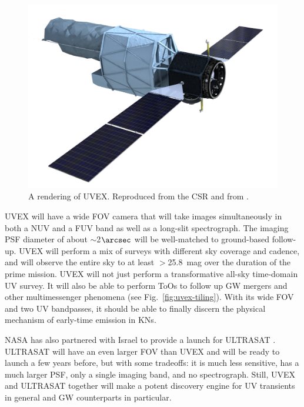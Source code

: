 \documentclass[twocolumn,times]{aastex631}
\begin{document}
\begin{figure}
    \includegraphics[width=\columnwidth]{figures/UVEXrender}
    \caption{\label{fig:render}A rendering of \ac{UVEX}. Reproduced from the \ac{CSR} and from \citet{2021arXiv211115608K}.}
\end{figure}

\ac{UVEX} will have a wide \ac{FOV} camera that will take images simultaneously in both a \ac{NUV} and a \ac{FUV} band as well as a long-slit spectrograph. The imaging \ac{PSF} diameter of about $\sim$2$\arcsec$ will be well-matched to ground-based follow-up. \ac{UVEX} will perform a mix of surveys with different sky coverage and cadence, and will observe the entire sky to at least $>$25.8~mag over the duration of the prime mission. \ac{UVEX} will not just perform a transformative all-sky time-domain \ac{UV} survey. It will also be able to perform \acp{ToO} to follow up \ac{GW} mergers and other multimessenger phenomena (see Fig.~\ref{fig:uvex-tiling}). With its wide \ac{FOV} and two \ac{UV} bandpasses, it should be able to finally discern the physical mechanism of early-time emission in \acp{KN}.

NASA has also partnered with Israel to provide a launch for ULTRASAT \citep{2024ApJ...964...74S}. ULTRASAT will have an even larger \ac{FOV} than \ac{UVEX} and will be ready to launch a few years before, but with some tradeoffs: it is much less sensitive, has a much larger \ac{PSF}, only a single imaging band, and no spectrograph. Still, \ac{UVEX} and ULTRASAT together will make a potent discovery engine for \ac{UV} transients in general and \ac{GW} counterparts in particular.
\end{document}
